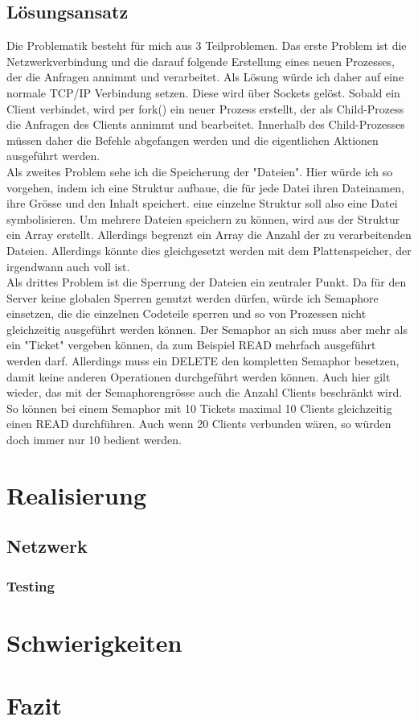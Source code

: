 \documentclass[12pt,a4paper,ngerman]{report}
\begin{document}
\section*{Lösungsansatz}
Die Problematik besteht für mich aus 3 Teilproblemen. Das erste Problem ist die Netzwerkverbindung und die darauf folgende Erstellung eines neuen Prozesses, der die Anfragen annimmt und verarbeitet. Als Lösung würde ich daher auf eine normale TCP/IP Verbindung setzen. Diese wird über Sockets gelöst. Sobald ein Client verbindet, wird per fork() ein neuer Prozess erstellt, der als Child-Prozess die Anfragen des Clients annimmt und bearbeitet. Innerhalb des Child-Prozesses müssen daher die Befehle abgefangen werden und die eigentlichen Aktionen ausgeführt werden.
\\
Als zweites Problem sehe ich die Speicherung der "Dateien". Hier würde ich so vorgehen, indem ich eine Struktur aufbaue, die für jede Datei ihren Dateinamen, ihre Grösse und den Inhalt speichert. eine einzelne Struktur soll also eine Datei symbolisieren. Um mehrere Dateien speichern zu können, wird aus der Struktur ein Array erstellt. Allerdings begrenzt ein Array die Anzahl der zu verarbeitenden Dateien. Allerdings könnte dies gleichgesetzt werden mit dem Plattenspeicher, der irgendwann auch voll ist.
\\
Als drittes Problem ist die Sperrung der Dateien ein zentraler Punkt. Da für den Server keine globalen Sperren genutzt werden dürfen, würde ich Semaphore einsetzen, die die einzelnen Codeteile sperren und so von Prozessen nicht gleichzeitig ausgeführt werden können. Der Semaphor an sich muss aber mehr als ein "Ticket" vergeben können, da zum Beispiel READ mehrfach ausgeführt werden darf. Allerdings muss ein DELETE den kompletten Semaphor besetzen, damit keine anderen Operationen durchgeführt werden können.
Auch hier gilt wieder, das mit der Semaphorengrösse auch die Anzahl Clients beschränkt wird. So können bei einem Semaphor mit 10 Tickets maximal 10 Clients gleichzeitig einen READ durchführen. Auch wenn 20 Clients verbunden wären, so würden doch immer nur 10 bedient werden.
\chapter*{Realisierung}
\section{Netzwerk}
\subsection{Testing}
\chapter*{Schwierigkeiten}
\chapter*{Fazit}
\end{document}
